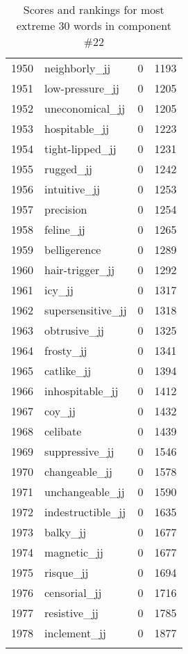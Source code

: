 \begin{longtable}[!htbp]{| rlr@{.}l |}
    1950 & neighborly\_jj & 0 & 1193 \\
    1951 & low-pressure\_jj & 0 & 1205 \\
    1952 & uneconomical\_jj & 0 & 1205 \\
    1953 & hospitable\_jj & 0 & 1223 \\
    1954 & tight-lipped\_jj & 0 & 1231 \\
    1955 & rugged\_jj & 0 & 1242 \\
    1956 & intuitive\_jj & 0 & 1253 \\
    1957 & precision & 0 & 1254 \\
    1958 & feline\_jj & 0 & 1265 \\
    1959 & belligerence & 0 & 1289 \\
    1960 & hair-trigger\_jj & 0 & 1292 \\
    1961 & icy\_jj & 0 & 1317 \\
    1962 & supersensitive\_jj & 0 & 1318 \\
    1963 & obtrusive\_jj & 0 & 1325 \\
    1964 & frosty\_jj & 0 & 1341 \\
    1965 & catlike\_jj & 0 & 1394 \\
    1966 & inhospitable\_jj & 0 & 1412 \\
    1967 & coy\_jj & 0 & 1432 \\
    1968 & celibate & 0 & 1439 \\
    1969 & suppressive\_jj & 0 & 1546 \\
    1970 & changeable\_jj & 0 & 1578 \\
    1971 & unchangeable\_jj & 0 & 1590 \\
    1972 & indestructible\_jj & 0 & 1635 \\
    1973 & balky\_jj & 0 & 1677 \\
    1974 & magnetic\_jj & 0 & 1677 \\
    1975 & risque\_jj & 0 & 1694 \\
    1976 & censorial\_jj & 0 & 1716 \\
    1977 & resistive\_jj & 0 & 1785 \\
    1978 & inclement\_jj & 0 & 1877 \\
    \hline
    \caption{Scores and rankings for most extreme 30 words in component \#22} \\
\end{longtable}
